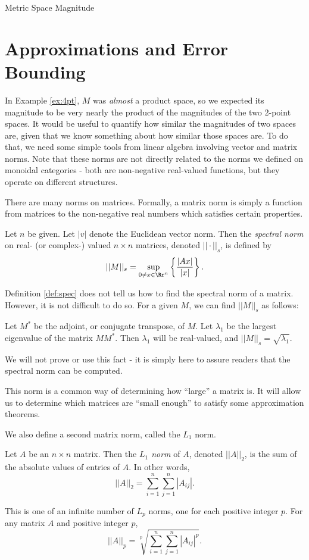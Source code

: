 \documentclass[12pt]{pom_thesis}
\begin{document}
\begin{chapter}{Metric Space Magnitude}
\section{Approximations and Error Bounding}
In Example \ref{ex:4pt}, $M$ was \emph{almost} a product space, so we expected its magnitude to be very nearly the product of the magnitudes of the two 2-point spaces. It would be useful to quantify how similar the magnitudes of two spaces are, given that we know something about how similar those spaces are. To do that, we need some simple tools from linear algebra involving vector and matrix norms. Note that these norms are not directly related to the norms we defined on monoidal categories - both are non-negative real-valued functions, but they operate on different structures.

There are many norms on matrices. Formally, a matrix norm is simply a function from matrices to the non-negative real numbers which satisfies certain properties.

\begin{defn}\label{def:spec}
Let $n$ be given. Let $|v|$ denote the Euclidean vector norm. Then the \emph{spectral norm} on real- (or complex-) valued $n \times n$ matrices, denoted $||\cdot ||_s$, is defined by
\[
||M||_s = \sup_{0 \neq x \in \Rr^n}\left\{ \frac{|Ax|}{|x|} \right\}.
\]
\end{defn}
\begin{rmk}
Definition \ref{def:spec} does not tell us how to find the spectral norm of a matrix. However, it is not difficult to do so. For a given $M$, we can find $||M||_s$ as follows:

Let $M^*$ be the adjoint, or conjugate transpose, of $M$. Let $\lambda_1$ be the largest eigenvalue of the matrix $MM^*$. Then $\lambda_1$ will be real-valued, and $||M||_s=\sqrt{\lambda_1}$. 

We will not prove or use this fact - it is simply here to assure readers that the spectral norm can be computed.
\end{rmk}
This norm is a common way of determining how ``large'' a matrix is. It will allow us to determine which matrices are ``small enough'' to satisfy some approximation theorems.

We also define a second matrix norm, called the $L_1$ norm.
\begin{defn}
Let $A$ be an $n \times n$ matrix. Then the \emph{$L_1$ norm} of $A$, denoted $||A||_2$, is the sum of the absolute values of entries of $A$. In other words,
\[
||A||_2 = \sum_{i = 1}^n\sum_{j = 1}^n |A_{ij}|.
\]
\end{defn}
\begin{rmk}
This is one of an infinite number of $L_p$ norms, one for each positive integer $p$. For any matrix $A$ and positive integer $p$, 
\[
||A||_p = \sqrt[p]{\sum_{i = 1}^n\sum_{j = 1}^n |A_{ij}|^p}.
\]
\end{rmk}






\end{chapter}
\end{document}
